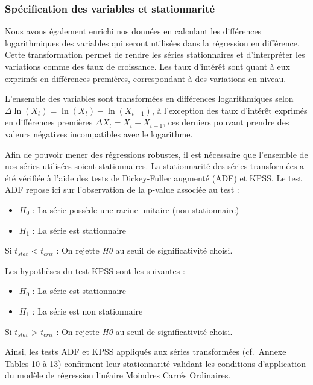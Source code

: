 \documentclass[
]{article}
\begin{document}
\subsubsection{Spécification des variables et
stationnarité}\label{spuxe9cification-des-variables-et-stationnarituxe9}

Nous avons également enrichi nos données en calculant les différences
logarithmiques des variables qui seront utilisées dans la régression en
différence. Cette transformation permet de rendre les séries
stationnaires et d'interpréter les variations comme des taux de
croissance. Les taux d'intérêt sont quant à eux exprimés en différences
premières, correspondant à des variations en niveau.

L'ensemble des variables sont transformées en différences logarithmiques
selon \(\Delta\ln(X_t) = \ln(X_t) - \ln(X_{t-1})\), à l'exception des
taux d'intérêt exprimés en différences premières
\(\Delta X_t = X_t - X_{t-1}\), ces derniers pouvant prendre des valeurs
négatives incompatibles avec le logarithme.

Afin de pouvoir mener des régressions robustes, il est nécessaire que
l'ensemble de nos séries utilisées soient stationnaires. La
stationnarité des séries transformées a été vérifiée à l'aide des tests
de Dickey-Fuller augmenté (ADF) et KPSS. Le test ADF repose ici sur
l'observation de la p-value associée au test :

\begin{itemize}
    \item $H_0$ : La série possède une racine unitaire (non-stationnaire)
    \item $H_1$  : La série est stationnaire
\end{itemize}

Si \(t_{stat}\) \textless{} \(t_{crit}\) : On rejette \emph{H0} au seuil
de significativité choisi.

Les hypothèses du test KPSS sont les suivantes :

\begin{itemize}
  \item $H_0$ : La série est stationnaire
  \item $H_1$ : La série est non stationnaire
\end{itemize}

Si \(t_{stat}\) \textgreater{} \(t_{crit}\) : On rejette \emph{H0} au
seuil de significativité choisi.

Ainsi, les tests ADF et KPSS appliqués aux séries transformées
(cf.~Annexe Tables 10 à 13) confirment leur stationnarité validant les
conditions d'application du modèle de régression linéaire Moindres
Carrés Ordinaires.
\end{document}
